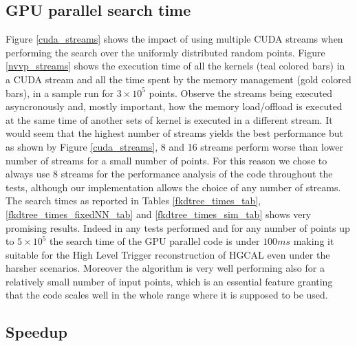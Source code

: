 \subsection{GPU parallel search time}
Figure \ref{cuda_streams} shows the impact of using multiple CUDA streams when performing the search over the uniformly distributed random points. Figure \ref{nvvp_streams} shows the execution time of all the kernels (teal colored bars) in a CUDA stream and all the time spent by the memory management (gold colored bars), in a sample run for $3 \times 10^5$ points. Observe the streams being executed asyncronously and, mostly important, how the memory load/offload is executed at the same time of another sets of kernel is executed in a different stream. It would seem that the highest number of streams yields the best performance but as shown by Figure \ref{cuda_streams}, 8 and 16 streams perform worse than lower number of streams for a small number of points. For this reason we chose to always use 8 streams for the performance analysis of the code throughout the tests, although our implementation allows the choice of any number of streams.\\
The search times as reported in Tables \ref{fkdtree_times_tab}, \ref{fkdtree_times_fixedNN_tab} and \ref{fkdtree_times_sim_tab} shows very promising results. Indeed in any tests performed and for any number of points up to $5 \times 10^5$ the search time of the GPU parallel code is under $100 \unit{ms}$ making it suitable for the High Level Trigger reconstruction of HGCAL even under the harsher scenarios. Moreover the algorithm is very well performing also for a relatively small number of input points, which is an essential feature granting that the code scales well in the whole range where it is supposed to be used.

\subsection{Speedup}

